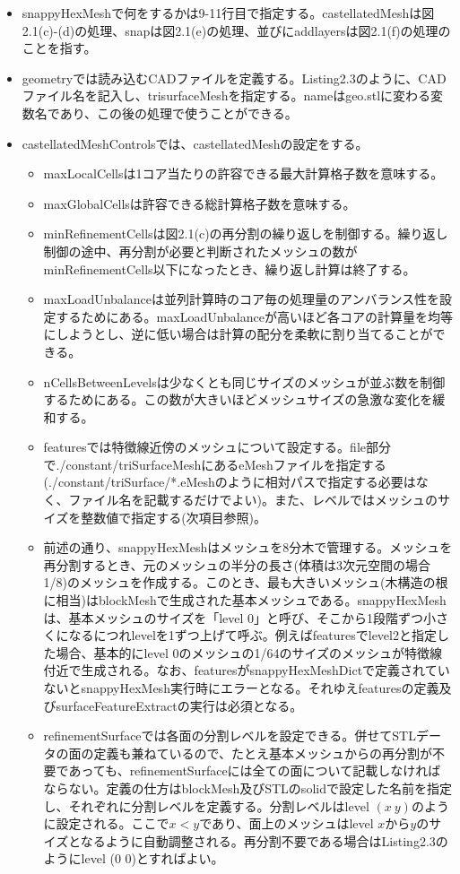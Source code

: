 \documentclass[dvipdfmx, 9pt, a4paper]{jsarticle}
\numberwithin{equation}{section}
\begin{document}
\begin{itemize}
\item snappyHexMeshで何をするかは9-11行目で指定する。castellatedMeshは図2.1(c)-(d)の処理、snapは図2.1(e)の処理、並びにaddlayersは図2.1(f)の処理のことを指す。
\item geometryでは読み込むCADファイルを定義する。Listing2.3のように、CADファイル名を記入し、trisurfaceMeshを指定する。nameはgeo.stlに変わる変数名であり、この後の処理で使うことができる。
\item castellatedMeshControlsでは、castellatedMeshの設定をする。
\begin{itemize}
\item maxLocalCellsは1コア当たりの許容できる最大計算格子数を意味する。
\item maxGlobalCellsは許容できる総計算格子数を意味する。
\item minRefinementCellsは図2.1(c)の再分割の繰り返しを制御する。繰り返し制御の途中、再分割が必要と判断されたメッシュの数がminRefinementCells以下になったとき、繰り返し計算は終了する。
\item maxLoadUnbalanceは並列計算時のコア毎の処理量のアンバランス性を設定するためにある。maxLoadUnbalanceが高いほど各コアの計算量を均等にしようとし、逆に低い場合は計算の配分を柔軟に割り当てることができる。
\item nCellsBetweenLevelsは少なくとも同じサイズのメッシュが並ぶ数を制御するためにある。この数が大きいほどメッシュサイズの急激な変化を緩和する。
\item featuresでは特徴線近傍のメッシュについて設定する。file部分で./constant/triSurfaceMeshにあるeMeshファイルを指定する(./constant/triSurface/*.eMeshのように相対パスで指定する必要はなく、ファイル名を記載するだけでよい)。また、レベルではメッシュのサイズを整数値で指定する(次項目参照)。
\item 前述の通り、snappyHexMeshはメッシュを8分木で管理する。メッシュを再分割するとき、元のメッシュの半分の長さ(体積は3次元空間の場合1/8)のメッシュを作成する。このとき、最も大きいメッシュ(木構造の根に相当)はblockMeshで生成された基本メッシュである。snappyHexMeshは、基本メッシュのサイズを「level 0」と呼び、そこから1段階ずつ小さくになるにつれlevelを1ずつ上げて呼ぶ。例えばfeaturesでlevel2と指定した場合、基本的にlevel 0のメッシュの1/64のサイズのメッシュが特徴線付近で生成される。なお、featuresがsnappyHexMeshDictで定義されていないとsnappyHexMesh実行時にエラーとなる。それゆえfeaturesの定義及びsurfaceFeatureExtractの実行は必須となる。
\item refinementSurfaceでは各面の分割レベルを設定できる。併せてSTLデータの面の定義も兼ねているので、たとえ基本メッシュからの再分割が不要であっても、refinementSurfaceには全ての面について記載しなければならない。定義の仕方はblockMesh及びSTLのsolidで設定した名前を指定し、それぞれに分割レベルを定義する。分割レベルはlevel $(x~y)$のように設定される。ここで$x<y$であり、面上のメッシュはlevel $x$から$y$のサイズとなるように自動調整される。再分割不要である場合はListing2.3のようにlevel (0 0)とすればよい。

\end{itemize}
\end{itemize}
\end{document}
